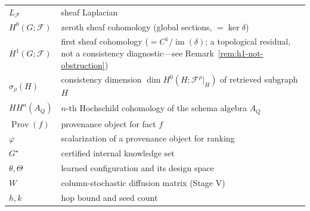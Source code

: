 \documentclass[11pt]{article}
\newcommand{\Prov}{\operatorname{Prov}}
\newcommand{\F}{\mathcal{F}}
\begin{document}
\begin{longtable}{p{}p{}}
$L_{\F}$ & sheaf Laplacian \\
$H^0(G;\F)$ & zeroth sheaf cohomology (global sections, $=\ker\delta$) \\
$H^1(G;\F)$ & first sheaf cohomology ($=C^1/\operatorname{im}(\delta)$; a topological residual, not a consistency diagnostic---see Remark~\ref{rem:h1-not-obstruction}) \\
$\sigma_\rho(H)$ & consistency dimension $\dim H^0(H;\F^{\rho}|_H)$ of retrieved subgraph $H$ \\
$HH^n(A_Q)$ & $n$-th Hochschild cohomology of the schema algebra $A_Q$ \\
$\Prov(f)$ & provenance object for fact $f$ \\
$\varphi$ & scalarization of a provenance object for ranking \\
$G^{\star}$ & certified internal knowledge set \\
$\theta,\Theta$ & learned configuration and its design space \\
$W$ & column-stochastic diffusion matrix (Stage V) \\
$h,k$ & hop bound and seed count \\
\bottomrule
\end{longtable}
\end{document}
